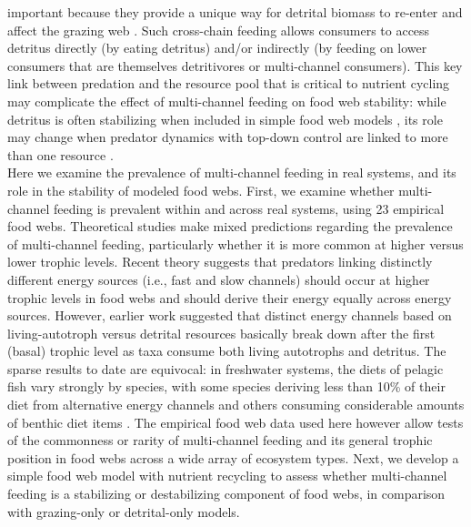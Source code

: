 \documentclass[12pt,a4paper,oneside]{article}
\begin{document}
important because they provide a unique way for detrital
biomass to re-enter and affect the grazing web \citep{Polis:1996}. Such cross-chain feeding allows consumers to access detritus
directly (by eating detritus) and/or indirectly (by feeding on lower consumers
that are themselves detritivores or multi-channel consumers). This key link between
predation and the resource pool that is critical to nutrient cycling may
complicate the effect of multi-channel feeding on food web
stability: while detritus is often stabilizing when included in simple
food web models \citep{Moore:2004}, its role may change when predator
dynamics with top-down control are linked to more than one resource \citep{Holt:1994}.
\\
\indent Here we examine the prevalence of multi-channel feeding in real systems, and its role in the stability of modeled food webs. First, we examine whether multi-channel feeding is prevalent within and across real systems, using 23 empirical food
webs. Theoretical studies make mixed predictions regarding the
prevalence of multi-channel feeding, particularly whether it is more common at
higher versus lower trophic levels. Recent theory suggests that predators linking distinctly different energy
sources (i.e., fast and slow channels) should occur at higher trophic levels in food webs
\citep{Rooney:2006} and should derive their energy equally
across energy sources. However, earlier work suggested that distinct energy channels
based on living-autotroph versus detrital resources basically
break down after the first (basal) trophic level 
\citep{Odum:1984,Moore:1988ar,Moore:1988} as taxa consume both
living autotrophs and detritus. The sparse results to date are equivocal: in freshwater systems, the diets of
pelagic fish vary strongly by species, with some species deriving less
than 10\% of their diet from
alternative energy channels and others consuming considerable amounts
of benthic diet items \citep{Vander-Zanden:2002}. The empirical food web
data used here however allow tests of the commonness or rarity of
multi-channel feeding and its general trophic position in food webs across a wide array of ecosystem types. Next, we develop a simple food web model with nutrient
recycling to assess whether multi-channel feeding is a stabilizing or destabilizing component of food webs, in comparison with grazing-only or detrital-only models.
\\
\\
\\
\end{document}
